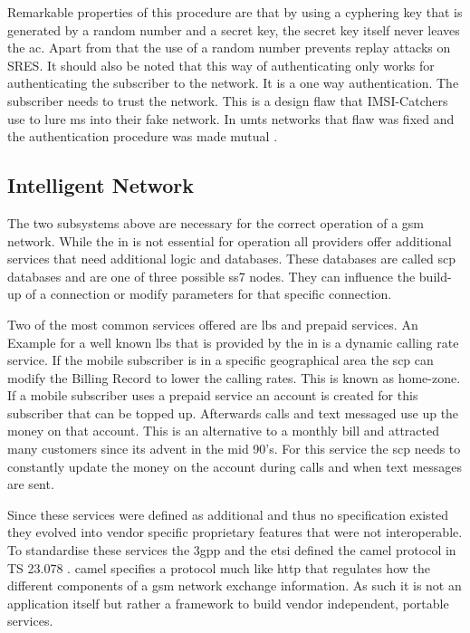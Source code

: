 Remarkable properties of this procedure are that by using a cyphering key that is generated by a random number and a secret key, the secret key itself never leaves the \gls{ac}.
Apart from that the use of a random number prevents replay attacks on SRES.
It should also be noted that this way of authenticating only works for authenticating the subscriber to the network.
It is a one way authentication.
The subscriber needs to trust the network.
This is a design flaw that IMSI-Catchers use to lure \gls{ms} into their fake network.
In \gls{umts} networks that flaw was fixed and the authentication procedure was made mutual \cite{kommsys2006}.

\subsection{Intelligent Network}
The two subsystems above are necessary for the correct operation of a \gls{gsm} network.
While the \gls{in} is not essential for operation all providers offer additional services that need additional logic and databases.
These databases are called \gls{scp} databases and are one of three possible \gls{ss7} nodes.
They can influence the build-up of a connection or modify parameters for that specific connection.

Two of the most common services offered are \gls{lbs} and prepaid services.
An Example for a well known \gls{lbs} that is provided by the \gls{in} is a dynamic calling rate service.
If the mobile subscriber is in a specific geographical area the \gls{scp} can modify the Billing Record to lower the calling rates.
This is known as home-zone.
If a mobile subscriber uses a prepaid service an account is created for this subscriber that can be topped up.
Afterwards calls and text messaged use up the money on that account.
This is an alternative to a monthly bill and attracted many customers since its advent in the mid 90's.
For this service the \gls{scp} needs to constantly update the money on the account during calls and when text messages are sent.

Since these services were defined as additional and thus no specification existed they evolved into vendor specific proprietary features that were not interoperable.
To standardise these services the \gls{3gpp} and the \gls{etsi} defined the \gls{camel} protocol in TS 23.078 \cite{GSM23078}.
\gls{camel} specifies a protocol much like \gls{http} that regulates how the different components of a \gls{gsm} network exchange information.
As such it is not an application itself but rather a framework to build vendor independent, portable services.

